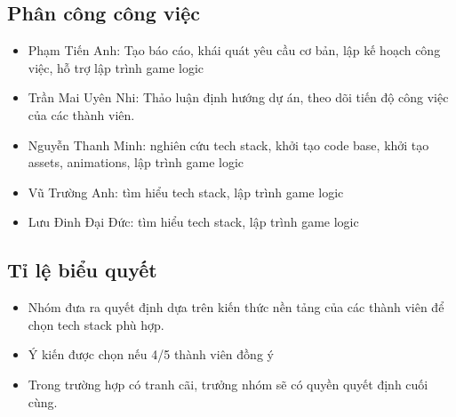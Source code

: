 \documentclass[a4paper, 12pt]{article}
\begin{document}
\subsection{Phân công công việc}
\begin{itemize}
    \item Phạm Tiến Anh: Tạo báo cáo, khái quát yêu cầu cơ bản, lập kế hoạch công việc, hỗ trợ lập trình game logic
    \item Trần Mai Uyên Nhi: Thảo luận định hướng dự án, theo dõi tiến độ công việc của các thành viên.
    \item Nguyễn Thanh Minh: nghiên cứu tech stack, khởi tạo code base, khởi tạo assets, animations, lập trình game logic
    \item Vũ Trường Anh: tìm hiểu tech stack, lập trình game logic
    \item Lưu Đinh Đại Đức: tìm hiểu tech stack, lập trình game logic
\end{itemize}

\subsection{Tỉ lệ biểu quyết}
\begin{itemize}
    \item Nhóm đưa ra quyết định dựa trên kiến thức nền tảng của các thành viên để chọn tech stack phù hợp.
    \item Ý kiến được chọn nếu 4/5 thành viên đồng ý
    \item Trong trường hợp có tranh cãi, trưởng nhóm sẽ có quyền quyết định cuối cùng.
\end{itemize}
\end{document}
